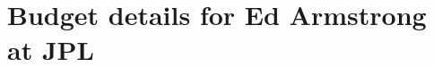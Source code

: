 \documentclass[11pt]{article}
\begin{document}
\clearpage %
\section{Budget details for Ed Armstrong at JPL}
\label{app-jpl-budget}
\begin{figure}[htbp]
    \centering
    
\end{figure}    

\clearpage %


\end{document}
